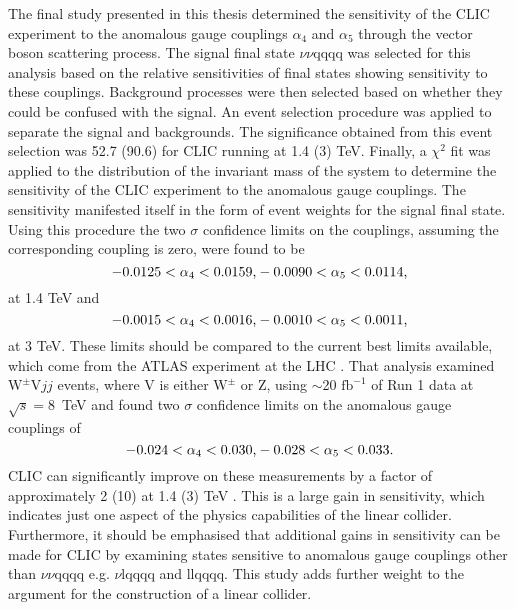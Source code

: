 The final study presented in this thesis determined the sensitivity of the CLIC experiment to the anomalous gauge couplings $\alpha_{4}$ and $\alpha_{5}$ through the vector boson scattering process.  The signal final state $\nu\nu\text{qqqq}$ was selected for this analysis based on the relative sensitivities of final states showing sensitivity to these couplings.  Background processes were then selected based on whether they could be confused with the signal.  An event selection procedure was applied to separate the signal and backgrounds.  The significance obtained from this event selection was 52.7 (90.6) for CLIC running at 1.4 (3) TeV.  Finally, a $\chi^{2}$ fit was applied to the distribution of the invariant mass of the system to determine the sensitivity of the CLIC experiment to the anomalous gauge couplings.  The sensitivity manifested itself in the form of event weights for the signal final state.  Using this procedure the {two} $\sigma$ confidence limits on the couplings, assuming the corresponding coupling is zero, were found to be
%
\begin{equation}
-0.0125 < \alpha_{4} < 0.0159 \text{,} \\
-0.0090 < \alpha_{5} < 0.0114 \text{,}
\end{equation}
%
\noindent at 1.4 TeV and
%
\begin{equation}
-0.0015 < \alpha_{4} < 0.0016 \text{,} \\
-0.0010 < \alpha_{5} < 0.0011 \text{,}
\end{equation}
%
\noindent at 3 TeV.  {These limits should be compared to the current best limits available, which come from the ATLAS experiment at the LHC \cite{Green:2016trm}.  That analysis examined $\text{W}^{\pm}\text{V}jj$ events, where V is either $\text{W}^{\pm}$ or Z, using $\sim$20 $\text{fb}^{-1}$ of Run 1 data at $\sqrt{s} = 8$~TeV and found two $\sigma$ confidence limits on the anomalous gauge couplings of}
%
\begin{equation}
-0.024 < \alpha_{4} < 0.030 \text{,} \\
-0.028 < \alpha_{5} < 0.033 \text{.}
\end{equation}
%
{CLIC can} significantly improve on these measurements by a factor of approximately 2 (10) at 1.4 (3) TeV \cite{Green:2016trm}.  This is a large gain in sensitivity, which indicates just one aspect of the physics capabilities of the linear collider.  {Furthermore, it should be emphasised that additional gains in sensitivity can be made for CLIC by examining states sensitive to anomalous gauge couplings other than $\nu\nu\text{qqqq}$ e.g. $\nu\text{lqqqq}$ and llqqqq.}  This study adds further weight to the argument for the construction of a linear collider.   

